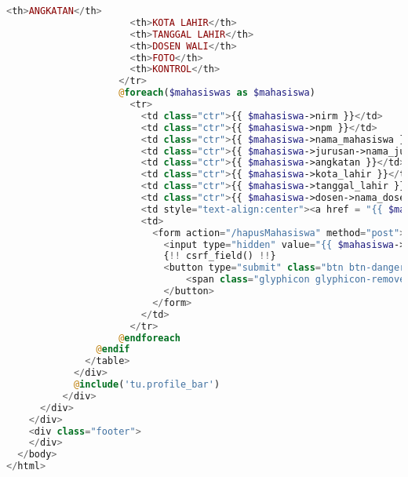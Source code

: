 \begin{lstlisting}[language=php,basicstyle=\tiny,caption=Data mahasiswa]
                      <th>ANGKATAN</th>
                      <th>KOTA LAHIR</th>
                      <th>TANGGAL LAHIR</th>
                      <th>DOSEN WALI</th>
                      <th>FOTO</th>
                      <th>KONTROL</th>
                    </tr>
                    @foreach($mahasiswas as $mahasiswa)
                      <tr>
                        <td class="ctr">{{ $mahasiswa->nirm }}</td>
                        <td class="ctr">{{ $mahasiswa->npm }}</td>
                        <td class="ctr">{{ $mahasiswa->nama_mahasiswa }}</td>
                        <td class="ctr">{{ $mahasiswa->jurusan->nama_jurusan }}</td>
                        <td class="ctr">{{ $mahasiswa->angkatan }}</td>
                        <td class="ctr">{{ $mahasiswa->kota_lahir }}</td>
                        <td class="ctr">{{ $mahasiswa->tanggal_lahir }}</td>
                        <td class="ctr">{{ $mahasiswa->dosen->nama_dosen }}</td>
                        <td style="text-align:center"><a href = "{{ $mahasiswa->foto }}">klik disini</a></td>
                        <td>
                          <form action="/hapusMahasiswa" method="post">
                            <input type="hidden" value="{{ $mahasiswa->id }}" name="deleteID">
                            {!! csrf_field() !!}
                            <button type="submit" class="btn btn-danger" aria-label="Remove" data-toggle="tooltip" title="Remove">
                                <span class="glyphicon glyphicon-remove" aria-hidden="true"></span>
                            </button>
                          </form>
                        </td>
                      </tr>
                    @endforeach
                @endif
              </table>
            </div>
            @include('tu.profile_bar')
          </div>
      </div>
    </div>
    <div class="footer">
    </div>
  </body>
</html>

\end{lstlisting}

